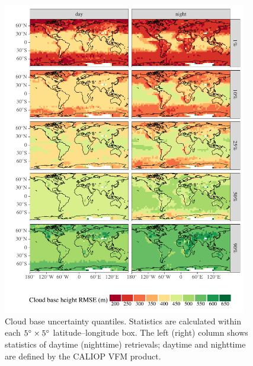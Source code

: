 \documentclass[essd,manuscript]{copernicus}\usepackage[]{graphicx}\usepackage[]{color}
\newenvironment{knitrout}{}{} %
\begin{document}
\begin{figure}
  \centering
\begin{knitrout}
\color{fgcolor}

{\centering \includegraphics[width=0.95\textwidth]{figure/method-cbase-uncert-quantiles-1} 

}



\end{knitrout}
  \caption{Cloud base uncertainty quantiles.  Statistics are calculated within
    each $5^{\circ}\times 5^{\circ}$ latitude--longitude box.  The left (right)
    column shows statistics of daytime (nighttime) retrievals; daytime and
    nighttime are defined by the CALIOP VFM product.}
  \label{fig:uncert-quantiles}
\end{figure}

\end{document}
